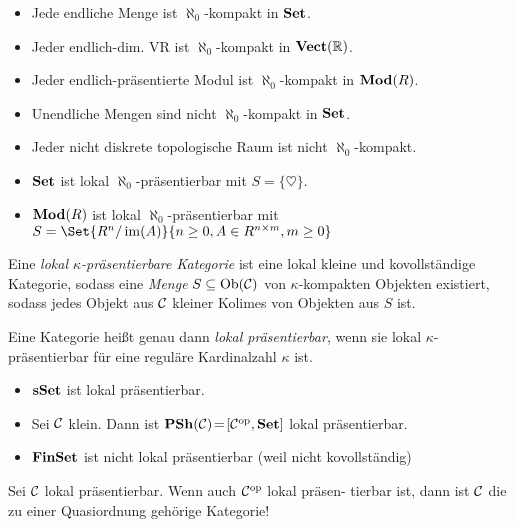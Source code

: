 \documentclass{cheat-sheet}
\begin{document}
\begin{bspe}
  \begin{itemize}
    \item Jede endliche Menge ist $\aleph_0$-kompakt in $\mathbf{Set}$.
    \item Jeder endlich-dim. VR ist $\aleph_0$-kompakt in $\mathbf{Vect}(\mathbb{R})$.
    \item Jeder endlich-präsentierte Modul ist $\aleph_0$-kompakt in $\mathbf{Mod}(R)$.
    \item Unendliche Mengen sind nicht $\aleph_0$-kompakt in $\mathbf{Set}$.
    \item Jeder nicht diskrete topologische Raum ist nicht $\aleph_0$-kompakt.
    \item $\mathbf{Set}$ ist lokal $\aleph_0$-präsentierbar mit $S = \{ \heartsuit \}$.
    \item $\mathbf{Mod}(R)$ ist lokal $\aleph_0$-präsentierbar mit $S = \Set{R^n/\im(A)}{n \geq 0, A \in R^{n \times m}, m \geq 0}$
  \end{itemize}
\end{bspe}

\begin{defn}
  Eine \emph{lokal $\kappa$-präsentierbare Kategorie} ist eine lokal kleine und kovollständige Kategorie, sodass eine {\em Menge} $S \subseteq \operatorname{Ob}(\mathcal{C})$ von $\kappa$-kompakten Objekten existiert, sodass jedes Objekt aus $\mathcal{C}$ kleiner Kolimes von Objekten aus $S$ ist.
\end{defn}


\begin{defn}
  Eine Kategorie heißt genau dann \emph{lokal präsentierbar}, wenn sie lokal $\kappa$-präsentierbar für eine reguläre Kardinalzahl $\kappa$ ist.
\end{defn}

\begin{bspe}
  \begin{itemize}
    \item $\mathbf{sSet}$ ist lokal präsentierbar.
    \item Sei $\mathcal{C}$ klein. Dann ist $\mathbf{PSh}(\mathcal{C}) \!=\! [\mathcal{C}^{\mathrm{op}}, \mathbf{Set}]$ lokal präsentierbar.
    \item $\mathbf{FinSet}$ ist nicht lokal präsentierbar (weil nicht kovollständig)
  \end{itemize}
\end{bspe}

\begin{fun}
  Sei $\mathcal{C}$ lokal präsentierbar. Wenn auch $\mathcal{C}^{\mathrm{op}}$ lokal präsen- tierbar ist, dann ist $\mathcal{C}$ die zu einer Quasiordnung gehörige Kategorie!
\end{fun}
\end{document}
